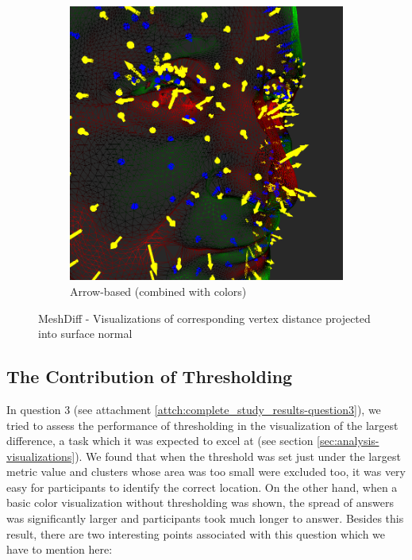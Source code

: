 \begin{figure}[h]
\begin{subfigure}{0.4\textwidth}
		\includegraphics[width=\textwidth]{./img/normal_projected_vis-arrows.PNG}
		\caption{Arrow-based (combined with colors)}
	\end{subfigure}
	\caption[MeshDiff - Absolute metric value visualizations]{MeshDiff - Visualizations of corresponding vertex distance projected into surface normal}
	\label{fig:meshdiff-normal_projected}
\end{figure}

\subsection{The Contribution of Thresholding}
\label{subsec:discussion-sig_results-thresholding_contrib}

In question 3 (see attachment \ref{attch:complete_study_results-question3}), we tried to assess the performance of thresholding in the visualization of the largest difference, a task which it was expected to excel at (see section \ref{sec:analysis-visualizations}). We found that when the threshold was set just under the largest metric value and clusters whose area was too small were excluded too\footnotemark, it was very easy for participants to identify the correct location. On the other hand, when a basic color visualization without thresholding was shown, the spread of answers was significantly larger and participants took much longer to answer. Besides this result, there are two interesting points associated with this question which we have to mention here:

